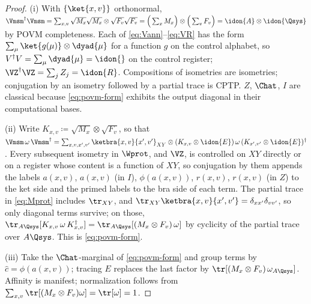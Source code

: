 \begin{proof}
(i) With $\{\ket{x,v}\}$ orthonormal,
$\Vmsm^{\dagger}\Vmsm
=\sum_{x,v}\sqrt{M_x}\sqrt{M_x}\otimes\sqrt{F_v}\sqrt{F_v}
=\Big(\sum_xM_x\Big)\otimes\Big(\sum_vF_v\Big)
=\idon{A}\otimes\idon{\Qsys}$
by POVM completeness. Each of \eqref{eq:Vann}--\eqref{eq:VR} has the form
$\sum_{\mu}\ket{g(\mu)}\otimes\dyad{\mu}$ for a function $g$ on the control
alphabet, so $V^{\dagger}V=\sum_{\mu}\dyad{\mu}=\idon{}$ on the control
register; $\VZ^{\dagger}\VZ=\sum_jZ_j=\idon{R}$. Compositions of isometries
are isometries; conjugation by an isometry followed by a partial trace is
CPTP. $Z$, $\Chat$, $I$ are classical because \eqref{eq:povm-form} exhibits
the output diagonal in their computational bases.

(ii) Write $K_{x,v}\coloneqq\sqrt{M_x}\otimes\sqrt{F_v}$, so that
$\Vmsm\,\omega\,\Vmsm^{\dagger}
=\sum_{x,v,x',v'}\ketbra{x,v}{x',v'}_{XY}\otimes
(K_{x,v}\otimes\idon{E})\,\omega\,(K_{x',v'}\otimes\idon{E})^{\dagger}$.
Every subsequent isometry in $\Wprot$, and $\VZ$, is controlled on $XY$
directly or on a register whose content is a function of $XY$, so
conjugation by them appends the labels
$a(x,v)$, $a(x,v)$ (in $I$), $\phi(a(x,v))$, $r(x,v)$, $r(x,v)$ (in $Z$) to
the ket side and the primed labels to the bra side of each term. The partial
trace in \eqref{eq:Mprot} includes $\tr_{XY}$, and
$\tr_{XY}\ketbra{x,v}{x',v'}=\delta_{xx'}\delta_{vv'}$, so only diagonal
terms survive; on those, $\tr_{A\Qsys}[K_{x,v}\,\omega\,K_{x,v}^{\dagger}]
=\tr_{A\Qsys}[(M_x\otimes F_v)\,\omega]$ by cyclicity of the partial trace
over $A\Qsys$. This is \eqref{eq:povm-form}.

(iii) Take the $\Chat$-marginal of \eqref{eq:povm-form} and group terms by
$\hat c=\phi(a(x,v))$; tracing $E$ replaces the last factor by
$\tr[(M_x\otimes F_v)\,\omega_{A\Qsys}]$. Affinity is manifest;
normalization follows from
$\sum_{x,v}\tr[(M_x\otimes F_v)\omega]=\tr[\omega]=1$.
\end{proof}
